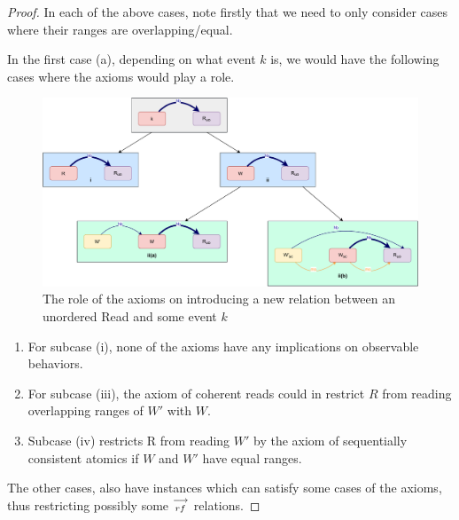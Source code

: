 \begin{proof}
        In each of the above cases, note firstly that we need to only consider cases where their ranges are overlapping/equal.
        
        In the first case (a), depending on what event $k$ is, we would have the following cases where the axioms would play a role. 
        
        \begin{figure}[H]
            \centering
            \includegraphics[scale=0.6]{Q3_(b)Case1.pdf}
            \caption{The role of the axioms on introducing a new relation between an unordered Read and some event $k$}
            \label{fig:my_label}
        \end{figure}
        
        \begin{enumerate}
            \item For subcase (i), none of the axioms have any implications on observable behaviors.
            \item For subcase (iii), the axiom of coherent reads could in restrict $R$ from reading overlapping ranges of $W'$ with $W$.
            \item Subcase (iv) restricts R from reading $W'$ by the axiom of sequentially consistent atomics if $W$ and $W'$ have equal ranges. 
        \end{enumerate}
        
        The other cases, also have instances which can satisfy some cases of the axioms, thus restricting possibly some $\stackrel{\longrightarrow}{_{rf}}$ relations.
        

\end{proof}
